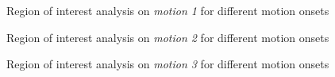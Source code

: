 \begin{figure}[ht]
    \caption{Region of interest analysis on \textit{motion 1} for different motion onsets}
    \label{fig:appendixmotion1ROI}
\end{figure}

\begin{figure}[ht]
    \caption{Region of interest analysis on \textit{motion 2} for different motion onsets}
    \label{fig:appendixmotion2ROI}
\end{figure}

\begin{figure}[ht]
    \caption{Region of interest analysis on \textit{motion 3} for different motion onsets}
    \label{fig:appendixmotion3ROI}
\end{figure}